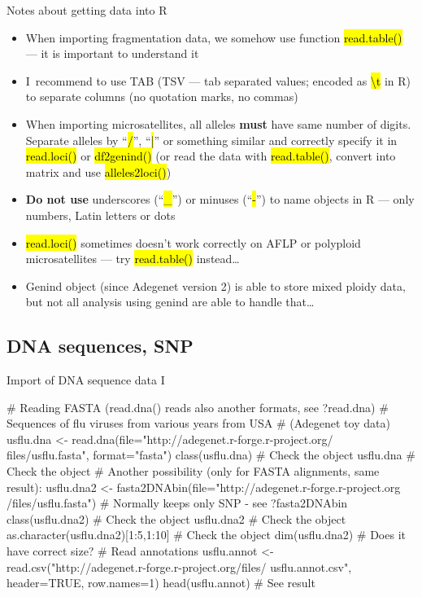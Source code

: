 \documentclass[compress, ucs, xelatex, 11pt, xcolor=svgnames,
	hyperref={
		bookmarks=true,
		unicode=true,
		colorlinks=true,
		pdftitle={Molecular data in R},
		plainpages=false,
		pdfauthor={Vojtech Zeisek},
		pdfsubject={Course about phylogeny and evolution in R},
		pdfcreator={XeLaTeX},
		pdfkeywords={R, evolution, phylogeny, molecular data},
		linkcolor=Tomato,
		anchorcolor=SaddleBrown,
		citecolor=Goldenrod,
		filecolor=DarkMagenta,
		menucolor=Sienna,
		urlcolor=DarkTurquoise,
		pdftex},
	url={hyphens, lowtilde} %
	]{beamer}
\renewcommand{\texttt}[1]{\hl{\ttfamily #1}}
\begin{document}
\begin{frame}{Notes about getting data into R}
	\begin{itemize}
		\item When importing fragmentation data, we somehow use function \texttt{read.table()} --- it is important to understand it
		\item I~recommend to use TAB (TSV --- tab separated values; encoded as \texttt{\textbackslash t} in R) to separate columns (no quotation marks, no commas)
		\item When importing microsatellites, all alleles \textbf{must} have same number of digits. Separate alleles by ``\texttt{/}'', ``\texttt{|}'' or something similar and correctly specify it in \texttt{read.loci()} or \texttt{df2genind()} (or read the data with \texttt{read.table()}, convert into matrix and use \texttt{alleles2loci()})
		\item \textbf{Do not use} underscores (``\texttt{\_}'') or minuses (``\texttt{-}'') to name objects in R --- only numbers, Latin letters or dots
		\item \texttt{read.loci()} sometimes doesn't work correctly on AFLP or polyploid microsatellites --- try \texttt{read.table()} instead\ldots
		\item Genind object (since Adegenet version 2) is able to store mixed ploidy data, but not all analysis using genind are able to handle that\ldots
	\end{itemize}
\end{frame}

\subsection{DNA sequences, SNP}

\begin{frame}[fragile]{Import of DNA sequence data I}
	\begin{spluscode}
    # Reading FASTA (read.dna() reads also another formats, see ?read.dna)
    # Sequences of flu viruses from various years from USA
    # (Adegenet toy data)
    usflu.dna <- read.dna(file="http://adegenet.r-forge.r-project.org/
      files/usflu.fasta", format="fasta")
    class(usflu.dna) # Check the object
    usflu.dna # Check the object
    # Another possibility (only for FASTA alignments, same result):
    usflu.dna2 <- fasta2DNAbin(file="http://adegenet.r-forge.r-project.org
      /files/usflu.fasta") # Normally keeps only SNP - see ?fasta2DNAbin
    class(usflu.dna2) # Check the object
    usflu.dna2 # Check the object
    as.character(usflu.dna2)[1:5,1:10] # Check the object
    dim(usflu.dna2) # Does it have correct size?
    # Read annotations
    usflu.annot <- read.csv("http://adegenet.r-forge.r-project.org/files/
      usflu.annot.csv", header=TRUE, row.names=1)
    head(usflu.annot) # See result
	\end{spluscode}
\end{frame}
\end{document}

